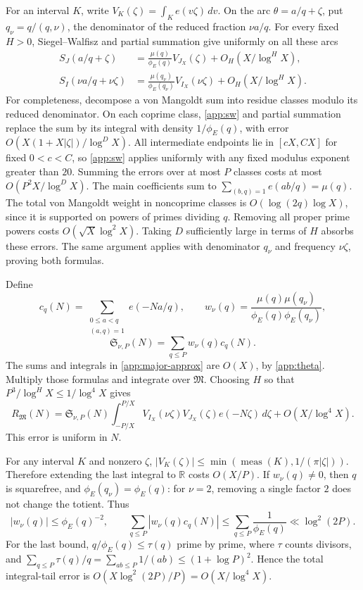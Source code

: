 \documentclass[11pt,letterpaper]{article}
\numberwithin{equation}{section}
\theoremstyle{definition}
\theoremstyle{remark}
\DeclareMathOperator{\meas}{meas}
\newcommand{\R}{\mathbb R}
\newcommand{\tot}{\phi_{\!E}}
\begin{document}
For an interval $K$, write $V_K(\zeta)=\int_K e(v\zeta)\,dv$.
On the arc $\theta=a/q+\zeta$, put
$q_\nu=q/(q,\nu)$, the denominator of the reduced fraction $\nu a/q$.
For every fixed $H>0$, Siegel--Walfisz and partial summation give
uniformly on all these arcs
\begin{equation}\label{app:major-approx}
 \begin{aligned}
 S_J(a/q+\zeta)
  &=\frac{\mu(q)}{\tot(q)}V_{J_X}(\zeta)
       +O_H(X/\log^H X),\\
 S_I(\nu a/q+\nu\zeta)
  &=\frac{\mu(q_\nu)}{\tot(q_\nu)}V_{I_X}(\nu\zeta)
       +O_H(X/\log^H X).
 \end{aligned}
\end{equation}
For completeness, decompose a von Mangoldt sum into residue classes
modulo its reduced denominator. On each coprime class,
\eqref{app:sw} and partial summation replace the sum by its integral
with density $1/\tot(q)$, with error
$O(X(1+X|\zeta|)/\log^D X)$.
All intermediate endpoints lie in $[cX,CX]$ for fixed $0<c<C$,
so \eqref{app:sw} applies uniformly with any fixed modulus exponent
greater than $20$. Summing the errors over at most $P$ classes costs
at most $O(P^2X/\log^D X)$. The main coefficients sum to
$\sum_{(b,q)=1}e(ab/q)=\mu(q)$.
The total von Mangoldt weight in noncoprime classes is
$O(\log(2q)\log X)$, since it is supported on powers of primes
dividing $q$. Removing all proper prime powers costs
$O(\sqrt X\log^2X)$. Taking $D$ sufficiently large in terms of $H$
absorbs these errors. The same argument applies with denominator
$q_\nu$ and frequency $\nu\zeta$, proving both formulas.

Define
\[
 c_q(N)=\sum_{\substack{0\le a<q\\(a,q)=1}}e(-Na/q),\qquad
 w_\nu(q)=\frac{\mu(q)\mu(q_\nu)}{\tot(q)\tot(q_\nu)},
\]
\[
 \mathfrak S_{\nu,P}(N)=\sum_{q\le P}w_\nu(q)c_q(N).
\]
The sums and integrals in \eqref{app:major-approx} are $O(X)$, by
\eqref{app:theta}. Multiply those formulas and integrate over
$\mathfrak M$. Choosing $H$ so that
$P^3/\log^H X\le1/\log^4X$ gives
\begin{equation}\label{app:major-truncated}
 R_{\mathfrak M}(N)
 =\mathfrak S_{\nu,P}(N)
    \int_{-P/X}^{P/X}
      V_{I_X}(\nu\zeta)V_{J_X}(\zeta)e(-N\zeta)\,d\zeta
   +O(X/\log^4X).
\end{equation}
This error is uniform in $N$.

For any interval $K$ and nonzero $\zeta$,
$|V_K(\zeta)|\le\min(\meas(K),1/(\pi|\zeta|))$.
Therefore extending the last integral to $\R$ costs $O(X/P)$.
If $w_\nu(q)\ne0$, then $q$ is squarefree, and
$\tot(q_\nu)=\tot(q)$: for $\nu=2$, removing a single factor $2$
does not change the totient. Thus
\begin{equation}\label{app:coefficient-bound}
 |w_\nu(q)|\le\tot(q)^{-2},\qquad
 \sum_{q\le P}|w_\nu(q)c_q(N)|
 \le\sum_{q\le P}\frac1{\tot(q)}\ll\log^2(2P).
\end{equation}
For the last bound, $q/\tot(q)\le\tau(q)$ prime by prime, where
$\tau$ counts divisors, and
$\sum_{q\le P}\tau(q)/q=\sum_{ab\le P}1/(ab)\le(1+\log P)^2$.
Hence the total integral-tail error is
$O(X\log^2(2P)/P)=O(X/\log^4X)$.
\end{document}
